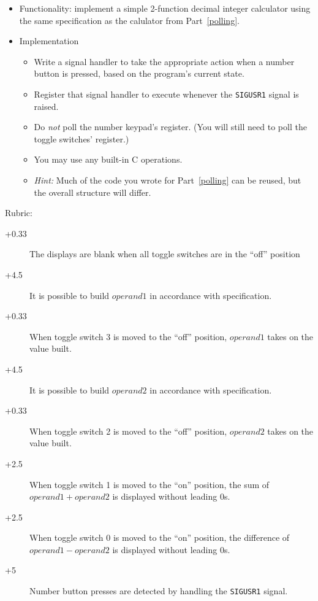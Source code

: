 \documentclass[12pt]{article}
\begin{document}
\begin{itemize}
    \item Functionality: implement a simple 2-function decimal integer
        calculator using the same specification as the calulator from
        Part~\ref{polling}.
    \item Implementation
    \begin{itemize}
        \item Write a signal handler to take the appropriate action when a
            number button is pressed, based on the program's current state.
        \item Register that signal handler to execute whenever the
            \texttt{SIGUSR1} signal is raised.
        \item Do \textit{not} poll the number keypad's register. (You will
            still need to poll the toggle switches' register.)
        \item You may use any built-in C operations.
        \item \textit{Hint: } Much of the code you wrote for Part~\ref{polling}
            can be reused, but the overall structure will differ.
    \end{itemize}
\end{itemize}

Rubric:
\begin{description}
    \item[\underline{\hspace{1cm}} +0.33] The displays are blank when all toggle
        switches are in the ``off'' position
    \item[\underline{\hspace{1cm}} +4.5] It is possible to build $operand1$ in
        accordance with specification.
    \item[\underline{\hspace{1cm}} +0.33] When toggle switch 3 is moved to the
        ``off'' position, $operand1$ takes on the value built.
    \item[\underline{\hspace{1cm}} +4.5] It is possible to build $operand2$ in
        accordance with specification.
    \item[\underline{\hspace{1cm}} +0.33] When toggle switch 2 is moved to the
        ``off'' position, $operand2$ takes on the value built.
    \item[\underline{\hspace{1cm}} +2.5] When toggle switch 1 is moved to the
        ``on'' position, the sum of $operand1 + operand2$ is displayed without
        leading $0$s.
    \item[\underline{\hspace{1cm}} +2.5] When toggle switch 0 is moved to the
        ``on'' position, the difference of $operand1 - operand2$ is displayed
        without leading $0$s.
    \item[\underline{\hspace{1cm}} +5] Number button presses are detected by
        handling the \texttt{SIGUSR1} signal.
\end{description}
\end{document}
